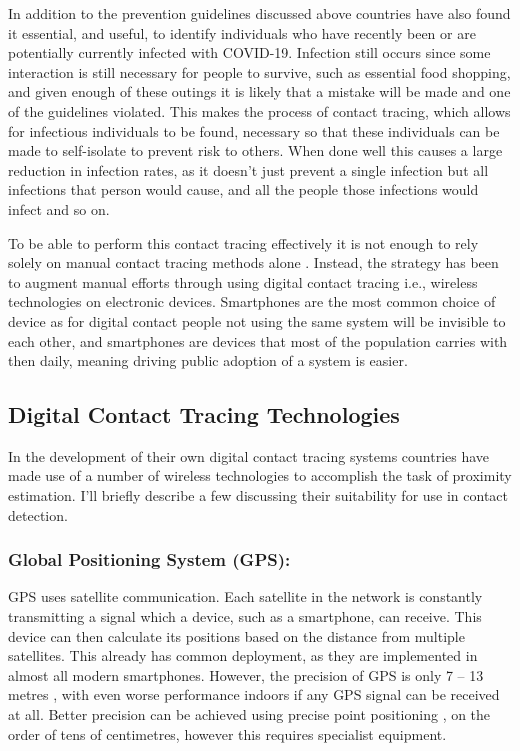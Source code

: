 \documentclass{l4proj}
\begin{document}
In addition to the prevention guidelines discussed above countries have also found it essential, and useful, to identify individuals who have recently been or are potentially currently infected with COVID-19. Infection still occurs since some interaction is still necessary for people to survive, such as essential food shopping, and given enough of these outings it is likely that a mistake will be made and one of the guidelines violated. This makes the process of contact tracing, which allows for infectious individuals to be found, necessary so that these individuals can be made to self-isolate to prevent risk to others. When done well this causes a large reduction in infection rates, as it doesn't just prevent a single infection but all infections that person would cause, and all the people those infections would infect and so on.

To be able to perform this contact tracing effectively it is not enough to rely solely on manual contact tracing methods alone \citep{shubina_technical_2020}. Instead, the strategy has been to augment manual efforts through using digital contact tracing i.e., wireless technologies on electronic devices. Smartphones are the most common choice of device as for digital contact people not using the same system will be invisible to each other, and smartphones are devices that most of the population carries with then daily, meaning driving public adoption of a system is easier.

\subsection{Digital Contact Tracing Technologies} \label{sec:dctt}

In the development of their own digital contact tracing systems countries have made use of a number of wireless technologies to accomplish the task of proximity estimation. I'll briefly describe a few discussing their suitability for use in contact detection.

\subsubsection{Global Positioning System (GPS):}

GPS uses satellite communication. Each satellite in the network is constantly transmitting a signal which a device, such as a smartphone, can receive. This device can then calculate its positions based on the distance from multiple satellites. This already has common deployment, as they are implemented in almost all modern smartphones. However, the precision of GPS is only 7 – 13 metres \citep{merry_smartphone_2019}, with even worse performance indoors if any GPS signal can be received at all. Better precision can be achieved using precise point positioning \citep{elmezayen_precise_2019}, on the order of tens of centimetres, however this requires specialist equipment.
\end{document}
